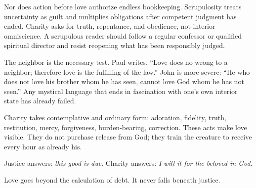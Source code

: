 Nor does action before love authorize endless bookkeeping. Scrupulosity treats uncertainty as guilt and multiplies obligations after competent judgment has ended. Charity asks for truth, repentance, and obedience, not interior omniscience. A scrupulous reader should follow a regular confessor or qualified spiritual director and resist reopening what has been responsibly judged.

The neighbor is the necessary test. Paul writes, ``Love does no wrong to a neighbor; therefore love is the fulfilling of the law.'' John is more severe: ``He who does not love his brother whom he has seen, cannot love God whom he has not seen.'' Any mystical language that ends in fascination with one's own interior state has already failed.

Charity takes contemplative and ordinary form: adoration, fidelity, truth, restitution, mercy, forgiveness, burden-bearing, correction. These acts make love visible. They do not purchase release from God; they train the creature to receive every hour as already his.

Justice answers: \emph{this good is due}. Charity answers: \emph{I will it for the beloved in God}.

Love goes beyond the calculation of debt. It never falls beneath justice.

